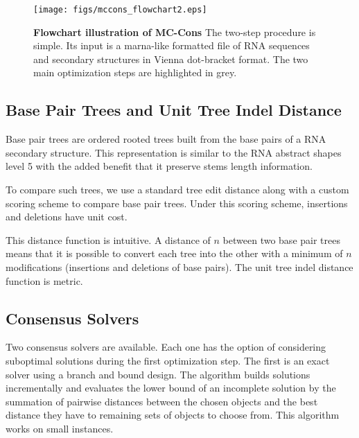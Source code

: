 \documentclass[10pt,letterpaper]{article}
\begin{document}
\begin{figure}[h]
\begin{center}
\texttt{[image: figs/mccons\_flowchart2.eps]}
\caption{{\bf Flowchart illustration of MC-Cons}
The two-step procedure is simple. Its input is a marna-like formatted file of RNA sequences and secondary structures in Vienna dot-bracket format. The two main optimization steps are highlighted in grey.}
\label{fig1}
\end{center}
\end{figure}


\subsection*{Base Pair Trees and Unit Tree Indel Distance}
Base pair trees are ordered rooted trees built from the base pairs of a RNA secondary structure. This representation is similar to the RNA abstract shapes level 5 \cite{abstract_shapes} with the added benefit that it preserve stems length information.


\noindent To compare such trees, we use a standard tree edit distance \cite{zhang_shasha} along with a custom scoring scheme to compare base pair trees. Under this scoring scheme, insertions and deletions have unit cost.

\noindent This distance function is intuitive. A distance of $n$ between two base pair trees means that it is possible to convert each tree into the other with a minimum of $n$ modifications (insertions and deletions of base pairs). The unit tree indel distance function is metric.






\subsection*{Consensus Solvers}
Two consensus solvers are available. Each one has the option of considering suboptimal solutions during the first optimization step. The first is an exact solver using a branch and bound design. The algorithm builds solutions incrementally and evaluates the lower bound of an incomplete solution by the summation of pairwise distances between the chosen objects and the best distance they have to remaining sets of objects to choose from. This algorithm works on small instances.
\end{document}
